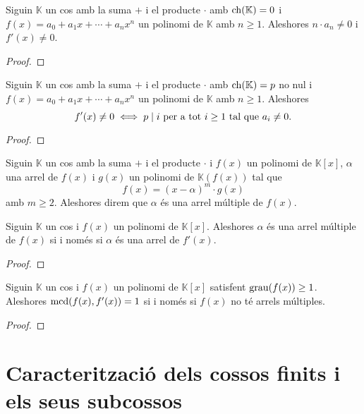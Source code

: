 \documentclass[../Apunts.tex]{subfiles}
\begin{document}
	\begin{proposition}
		Siguin \(\mathbb{K}\) un cos amb la suma \(+\) i el producte \(\cdot\) amb \(\operatorname{ch}(\mathbb{K})=0\) i \(f(x)=a_{0}+a_{1}x+\cdots+a_{n}x^{n}\) un polinomi de \(\mathbb{K}\) amb \(n\geq1\). Aleshores \(n\cdot a_{n}\neq0\) i \(f'(x)\neq0\).
		\begin{proof}
		\end{proof}
	\end{proposition}
	\begin{proposition}
		Siguin \(\mathbb{K}\) un cos amb la suma \(+\) i el producte \(\cdot\) amb \(\operatorname{ch}(\mathbb{K})=p\) no nul i \(f(x)=a_{0}+a_{1}x+\cdots+a_{n}x^{n}\) un polinomi de \(\mathbb{K}\) amb \(n\geq1\). Aleshores
		\[f'(x)\neq0\iff p\mathrel{|} i\text{ per a tot }i\geq1\text{ tal que }a_{i}\neq0.\]
		\begin{proof}
		\end{proof}
	\end{proposition}
	\begin{definition}
		\label{def:arrel múltiple}
		Siguin \(\mathbb{K}\) un cos amb la suma \(+\) i el producte \(\cdot\) i \(f(x)\) un polinomi de \(\mathbb{K}[x]\), \(\alpha\) una arrel de \(f(x)\) i \(g(x)\) un polinomi de \(\mathbb{K}(f(x))\) tal que 
		\[f(x)=(x-\alpha)^{m}\cdot g(x)\]
		amb \(m\geq2\). Aleshores direm que \(\alpha\) és una arrel múltiple de \(f(x)\).
	\end{definition}
	\begin{proposition}
		Siguin \(\mathbb{K}\) un cos i \(f(x)\) un polinomi de \(\mathbb{K}[x]\). Aleshores \(\alpha\) és una arrel múltiple de \(f(x)\) si i només si \(\alpha\) és una arrel de \(f'(x)\).
		\begin{proof}
		\end{proof}
	\end{proposition}
	\begin{corollary}
		Siguin \(\mathbb{K}\) un cos i \(f(x)\) un polinomi de \(\mathbb{K}[x]\) satisfent \(\operatorname{grau}(f(x))\geq1\). Aleshores \(\operatorname{mcd}(f(x),f'(x))=1\) si i només si \(f(x)\) no té arrels múltiples.
		\begin{proof}
		\end{proof}
	\end{corollary}
	\section{Caracterització dels cossos finits i els seus subcossos}
\end{document}
